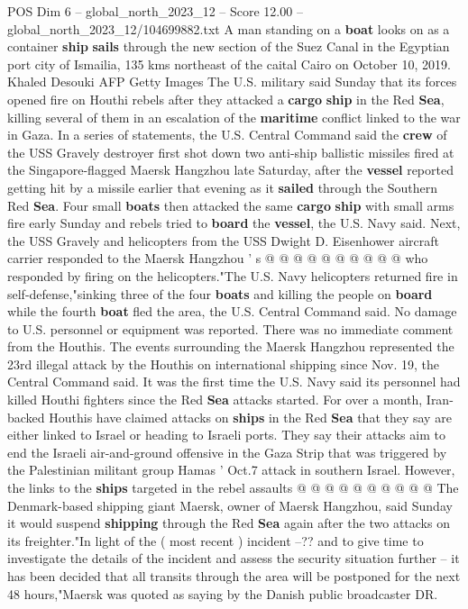\begin{textsample}{POS Dim 6 – global\_north\_2023\_12 – Score 12.00 – global\_north\_2023\_12/104699882.txt}  \label{ex:f6_pos_132}
A man standing on a \textbf{boat} looks on as a container \textbf{ship} \textbf{sails} through the new section of the Suez Canal in the Egyptian port city of Ismailia, 135 kms northeast of the caital Cairo on October 10, 2019.
Khaled Desouki AFP Getty Images The U.S. military said Sunday that its forces opened fire on Houthi rebels after they attacked a \textbf{cargo} \textbf{ship} in the Red \textbf{Sea}, killing several of them in an escalation of the \textbf{maritime} conflict linked to the war in Gaza.
In a series of statements, the U.S.
Central Command said the \textbf{crew} of the USS Gravely destroyer first shot down two anti-ship ballistic missiles fired at the Singapore-flagged Maersk Hangzhou late Saturday, after the \textbf{vessel} reported getting hit by a missile earlier that evening as it \textbf{sailed} through the Southern Red \textbf{Sea}.
Four small \textbf{boats} then attacked the same \textbf{cargo} \textbf{ship} with small arms fire early Sunday and rebels tried to \textbf{board} the \textbf{vessel}, the U.S.
Navy said.
Next, the USS Gravely and helicopters from the USS Dwight D.
Eisenhower aircraft carrier responded to the Maersk Hangzhou ' s @ @ @ @ @ @ @ @ @ @ who responded by firing on the helicopters."The U.S.
Navy helicopters returned fire in self-defense,"sinking three of the four \textbf{boats} and killing the people on \textbf{board} while the fourth \textbf{boat} fled the area, the U.S.
Central Command said.
No damage to U.S. personnel or equipment was reported.
There was no immediate comment from the Houthis.
The events surrounding the Maersk Hangzhou represented the 23rd illegal attack by the Houthis on international shipping since Nov. 19, the Central Command said.
It was the first time the U.S.
Navy said its personnel had killed Houthi fighters since the Red \textbf{Sea} attacks started.
For over a month, Iran-backed Houthis have claimed attacks on \textbf{ships} in the Red \textbf{Sea} that they say are either linked to Israel or heading to Israeli ports.
They say their attacks aim to end the Israeli air-and-ground offensive in the Gaza Strip that was triggered by the Palestinian militant group Hamas ' Oct.7 attack in southern Israel.
However, the links to the \textbf{ships} targeted in the rebel assaults @ @ @ @ @ @ @ @ @ @ The Denmark-based shipping giant Maersk, owner of Maersk Hangzhou, said Sunday it would suspend \textbf{shipping} through the Red \textbf{Sea} again after the two attacks on its freighter."In light of the ( most recent ) incident --?? and to give time to investigate the details of the incident and assess the security situation further -- it has been decided that all transits through the area will be postponed for the next 48 hours,"Maersk was quoted as saying by the Danish public broadcaster DR.

\end{textsample}
